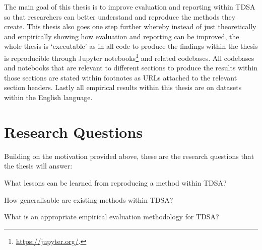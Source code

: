 The main goal of this thesis is to improve evaluation and reporting within TDSA so that researchers can better understand and reproduce the methods they create. This thesis also goes one step further whereby instead of just theoretically and empirically showing how evaluation and reporting can be improved, the whole thesis is `executable' as in all code to produce the findings within the thesis is reproducible through Jupyter notebooks\footnote{\url{https://jupyter.org/}.} and related codebases. All codebases and notebooks that are relevant to different sections to produce the results within those sections are stated within footnotes as URLs attached to the relevant section headers. Lastly all empirical results within this thesis are on datasets within the English language.


\section{Research Questions}
Building on the motivation provided above, these are the research questions that the thesis will answer:

\begin{researchq}
What lessons can be learned from reproducing a method within TDSA? 
\label{rq:lessons}
\end{researchq}

\begin{researchq}
How generalisable are existing methods within TDSA?
\label{rq:generalisable}
\end{researchq}

\begin{researchq}
What is an appropriate empirical evaluation methodology for TDSA?
\label{rq:measured}
\end{researchq}

